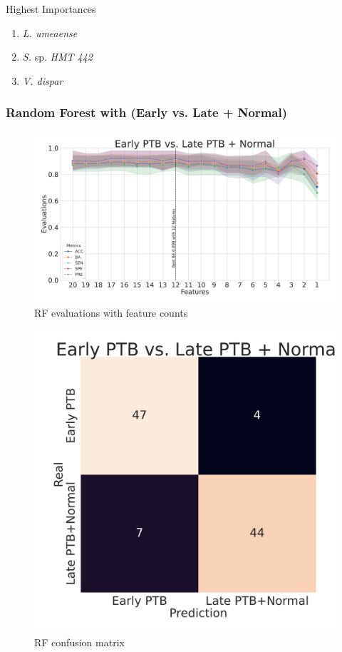 \documentclass{beamer}
\begin{document}
\begin{frame}[allowframebreaks]
        \begin{block}{Highest Importances}
            \begin{enumerate}
                \item \textit{L. umeaense}
                \item \textit{S.} sp. \textit{HMT 442}
                \item \textit{V. dispar}
            \end{enumerate}
        \end{block}
    \end{frame}

    \begin{frame}[allowframebreaks]
        \frametitle{Random Forest with (Early vs. Late + Normal)}

        \begin{figure}
            \includegraphics[width=0.8 \linewidth]{figures/RandomForest_Proportion/RF-two.DADA2.homd.Mouth/metrics.pdf}
            \caption{RF evaluations with feature counts}
        \end{figure}

        \begin{figure}
            \includegraphics[width=0.5 \linewidth]{figures/RandomForest_Proportion/RF-two.DADA2.homd.Mouth/heatmap.pdf}
            \caption{RF confusion matrix}
        \end{figure}


\end{frame}
\end{document}
